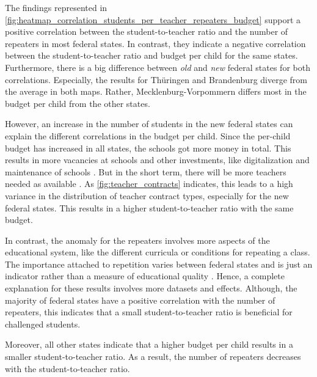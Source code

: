 The findings represented in \autoref{fig:heatmap_correlation_students_per_teacher_repeaters_budget} support a  positive correlation between the student-to-teacher ratio and the number of repeaters in most federal states. 
In contrast, they indicate a negative correlation between the student-to-teacher ratio  and budget per child for the same states. Furthermore, there is a big difference between \emph{old} and \emph{new} federal states for both correlations. Especially, the results for Thüringen and Brandenburg diverge from the average in both maps. Rather, Mecklenburg-Vorpommern differs most in the budget per child from the other states.

However,  an increase in the number of students in the new federal states can explain the different correlations in the budget per child. Since the per-child budget has increased in all states, the schools got more money in total. This results in more vacancies at schools \cite{kultusminister_konferenz_lehrkrafteeinstellungsbedarf_2023} and other investments, like digitalization and maintenance of schools \cite{bundesministerium_fur_bildung_und_forschung_fortschrittsbericht_2022}. But in the short term, there will be more teachers needed as available \cite{kultusminister_konferenz_lehrkrafteeinstellungsbedarf_2023}. As \autoref{fig:teacher_contracts} indicates, this leads to a high variance in the distribution of teacher contract types, especially for the new federal states. This results in a higher student-to-teacher ratio with the same budget.

In contrast, the anomaly for the repeaters involves more aspects of the educational system, like the different curricula or conditions for repeating a class. The importance attached to repetition varies between federal states and is just an indicator rather than a measure of educational quality \cite{klemm_klassenwiederholungen_2009}. Hence, a complete explanation for these results involves more datasets and effects. Although, the majority of federal states have a positive correlation with the number of repeaters, this indicates that a small student-to-teacher ratio is beneficial for challenged students.

Moreover, all other states indicate that a higher budget per child results in a smaller student-to-teacher ratio. As a result, the number of repeaters decreases with the student-to-teacher ratio.